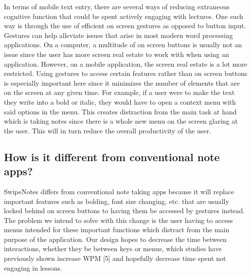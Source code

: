 \documentclass[conference]{IEEEtran}
\begin{document}
In terms of mobile text entry, there are several ways of reducing extraneous cognitive function that could be spent actively engaging with lectures. One such way is through the use of efficient on screen gestures as opposed to button input. Gestures can help alleviate issues that arise in most modern word processing applications. On a computer, a multitude of on screen buttons is usually not an issue since the user has more screen real estate to work with when using an application. However, on a mobile application, the screen real estate is a lot more restricted. Using gestures to access certain features rather than on screen buttons is especially important here since it minimizes the number of elements that are on the screen at any given time. For example, if a user were to make the text they write into a bold or italic, they would have to open a context menu with said options in the menu. This creates distraction from the main task at hand which is taking notes since there is a whole new menu on the screen glaring at the user. This will in turn reduce the overall productivity of the user.


\subsection{How is it different from conventional note apps?}

SwipeNotes differs from conventional note taking apps because it will replace important features such as bolding, font size changing, etc. that are usually locked behind on screen buttons to having them be accessed by gestures instead. The problem we intend to solve with this change is the user having to access menus intended for these important functions which distract from the main purpose of the application. Our design hopes to decrease the time between interactions, whether they be between keys or menus, which studies have previously shown increase WPM [5] and hopefully decrease time spent not engaging in lessons.
\end{document}
